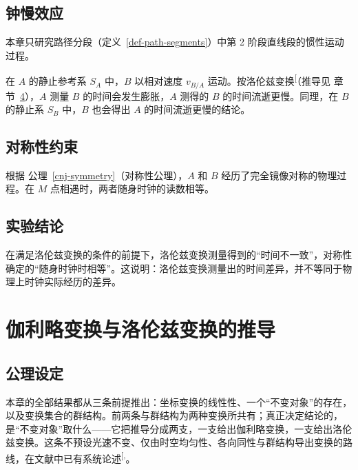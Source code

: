 \documentclass[
  chinese,
  a4paper,
  UTF8,
  12pt,
  oneside,
  openany]{ctexbook}
\theoremstyle{plain}
\theoremstyle{plain}
\theoremstyle{plain}
\theoremstyle{definition}
\theoremstyle{plain}
\theoremstyle{plain}
\theoremstyle{remark}
\begin{document}
\section{钟慢效应}\label{ux949fux6162ux6548ux5e94}

本章只研究路径分段（定义~\ref{def-path-segments}）中第 2
阶段直线段的惯性运动过程。

在 \(A\) 的静止参考系 \(S_A\) 中，\(B\) 以相对速度 \(v_{B/A}\)
运动。按洛伦兹变换\textsuperscript{{[}\citeproc{ref-einstein1905}{1}{]}}（推导见
章节~\ref{sec-transform-derivation}），\(A\) 测量 \(B\)
的时间会发生膨胀，\(A\) 测得的 \(B\) 的时间流逝更慢。同理，在 \(B\)
的静止系 \(S_B\) 中，\(B\) 也会得出 \(A\) 的时间流逝更慢的结论。

\section{对称性约束}\label{ux5bf9ux79f0ux6027ux7ea6ux675f}

根据 公理~\ref{cnj-symmetry}（对称性公理），\(A\) 和 \(B\)
经历了完全镜像对称的物理过程。在 \(M\)
点相遇时，两者随身时钟的读数相等。

\section{实验结论}\label{ux5b9eux9a8cux7ed3ux8bba}

在满足洛伦兹变换的条件的前提下，洛伦兹变换测量得到的``时间不一致''，对称性确定的``随身时钟时相等''。这说明：洛伦兹变换测量出的时间差异，并不等同于物理上时钟实际经历的差异。


\chapter{伽利略变换与洛伦兹变换的推导}\label{sec-transform-derivation}

\section{公理设定}\label{ux516cux7406ux8bbeux5b9a}

本章的全部结果都从三条前提推出：坐标变换的线性性、一个``不变对象''的存在，以及变换集合的群结构。前两条与群结构为两种变换所共有；真正决定结论的，是``不变对象''取什么------它把推导分成两支，一支给出伽利略变换，一支给出洛伦兹变换。这条不预设光速不变、仅由时空均匀性、各向同性与群结构导出变换的路线，在文献中已有系统论述\textsuperscript{{[},\citeproc{ref-berzigorini1969}{3}{]}}。
\end{document}

